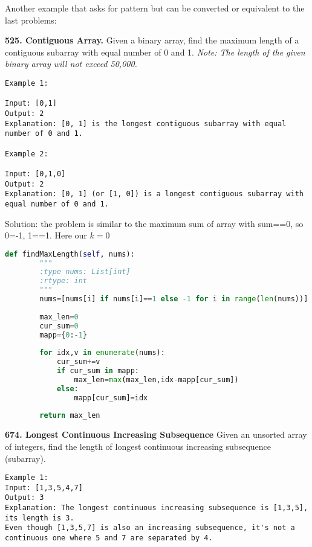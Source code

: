 \documentclass[../main.tex]{subfiles}
\begin{document}
\begin{examples}[resume]
Another example that asks for pattern but can be converted or equivalent to the last problems:

\item \textbf{525. Contiguous Array.} Given a binary array, find the maximum length of a contiguous subarray with equal number of 0 and 1. \textit{Note: The length of the given binary array will not exceed 50,000.}
\begin{lstlisting}[numbers=none]
Example 1:

Input: [0,1]
Output: 2
Explanation: [0, 1] is the longest contiguous subarray with equal number of 0 and 1.

Example 2:

Input: [0,1,0]
Output: 2
Explanation: [0, 1] (or [1, 0]) is a longest contiguous subarray with equal number of 0 and 1.
\end{lstlisting}

Solution: the problem is similar to the maximum sum of array with sum==0, so 0=-1, 1==1. Here our $k=0$
\begin{lstlisting}[language = Python]
def findMaxLength(self, nums):
        """
        :type nums: List[int]
        :rtype: int
        """
        nums=[nums[i] if nums[i]==1 else -1 for i in range(len(nums))]
        
        max_len=0
        cur_sum=0
        mapp={0:-1}
        
        for idx,v in enumerate(nums):
            cur_sum+=v
            if cur_sum in mapp:
                max_len=max(max_len,idx-mapp[cur_sum])
            else:
                mapp[cur_sum]=idx    
        
        return max_len
\end{lstlisting}

\item \textbf{674. Longest Continuous Increasing Subsequence} Given an unsorted array of integers, find the length of longest continuous increasing subsequence (subarray).
\begin{lstlisting}[numbers=none]
Example 1:
Input: [1,3,5,4,7]
Output: 3
Explanation: The longest continuous increasing subsequence is [1,3,5], its length is 3. 
Even though [1,3,5,7] is also an increasing subsequence, it's not a continuous one where 5 and 7 are separated by 4.


\end{lstlisting}
\end{examples}
\end{document}
